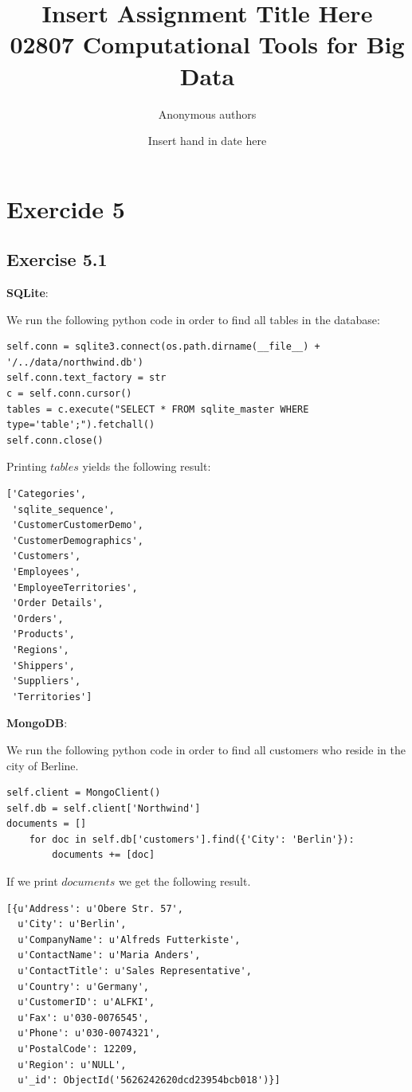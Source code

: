 \documentclass{article}
\title{Insert Assignment Title Here\\02807 Computational Tools for Big Data}
\author{Anonymous authors}
\date{Insert hand in date here}
\begin{document}
\maketitle

\section{Exercide 5}
\label{sec:Exercide 5}

\subsection{Exercise 5.1}
\label{sub:Exercise 5.1}

\textbf{SQLite}:

We run the following python code in order to find all tables in the database:

\begin{lstlisting}
self.conn = sqlite3.connect(os.path.dirname(__file__) + '/../data/northwind.db')
self.conn.text_factory = str
c = self.conn.cursor()
tables = c.execute("SELECT * FROM sqlite_master WHERE type='table';").fetchall()
self.conn.close()
\end{lstlisting}

Printing $tables$ yields the following result:

\begin{lstlisting}
['Categories',
 'sqlite_sequence',
 'CustomerCustomerDemo',
 'CustomerDemographics',
 'Customers',
 'Employees',
 'EmployeeTerritories',
 'Order Details',
 'Orders',
 'Products',
 'Regions',
 'Shippers',
 'Suppliers',
 'Territories']
\end{lstlisting}

\textbf{MongoDB}:

We run the following python code in order to find all customers who reside in the city of Berline.

\begin{lstlisting}
self.client = MongoClient()
self.db = self.client['Northwind']
documents = []
    for doc in self.db['customers'].find({'City': 'Berlin'}):
        documents += [doc]
\end{lstlisting}

If we print $documents$ we get the following result.

\begin{lstlisting}
[{u'Address': u'Obere Str. 57',
  u'City': u'Berlin',
  u'CompanyName': u'Alfreds Futterkiste',
  u'ContactName': u'Maria Anders',
  u'ContactTitle': u'Sales Representative',
  u'Country': u'Germany',
  u'CustomerID': u'ALFKI',
  u'Fax': u'030-0076545',
  u'Phone': u'030-0074321',
  u'PostalCode': 12209,
  u'Region': u'NULL',
  u'_id': ObjectId('5626242620dcd23954bcb018')}]
\end{lstlisting}
\end{document}
